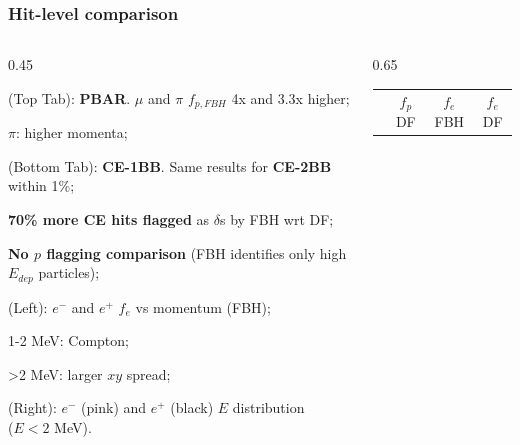 \documentclass{beamer}
\begin{document}
\begin{frame}
    \frametitle{Hit-level comparison}
    \vspace{-1mm}
    \begin{columns}
    \begin{column}{0.45\framewidth}
    \vspace{-2mm}
        \setlength{\leftmargini}{0.7em}
\begin{itemize}
{\small
    \item (Top Tab): \textbf{PBAR}. $\mu$ and $\pi$ $f_{p,FBH}$ 4x and 3.3x higher;
      \vspace{-0.5mm}
      \item $\pi$: higher momenta;
      \vspace{-0.5mm}
      \item (Bottom Tab): \textbf{CE-1BB}. Same results for \textbf{CE-2BB} within 1\%;
      \vspace{-0.5mm}
      \item \textbf{70\% more CE hits flagged} as $\delta$s by FBH wrt DF;
      \vspace{-0.5mm} 
      \item \textbf{No $p$ flagging comparison} (FBH identifies only high $E_{dep}$ particles);
      \vspace{-0.5mm}
      \item (Left): $e^-$ and $e^+$ $f_e$ vs momentum (FBH);
           \vspace{-0.5mm}
           \item 1-2 MeV: Compton;
           \vspace{-0.5mm}
           \item >2 MeV: larger $xy$ spread;
                      \vspace{-0.5mm}
           \item (Right): $e^-$ (pink) and $e^+$ (black) $E$ distribution \\ ($E<2$ MeV).
    }
\end{itemize}
        \end{column}
         \begin{column}{0.65\framewidth}
        \begin{table}[h!]
        \centering
        \hspace*{-0.5em}
        \renewcommand{\arraystretch}{0.7}
        \begin{tabular}{| c | c | c | c|} 
        \hline
         &  {\scriptsize $f_{p}$ DF} &  {\scriptsize $f_{e}$ FBH} & {\scriptsize $f_{e}$ DF}\\

\end{tabular}
\end{table}
\end{column}
\end{columns}
\end{frame}
\end{document}
